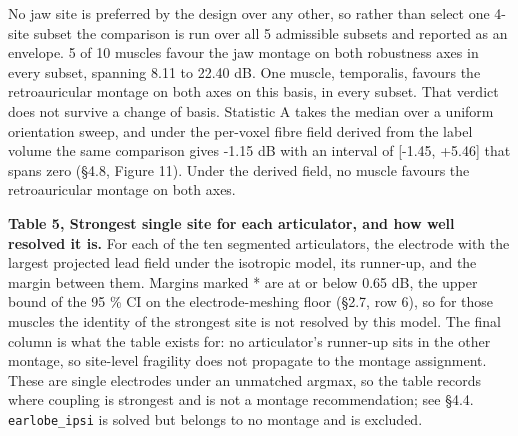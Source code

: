 \documentclass[
  11pt,
  a4paper,
]{article}
\begin{document}
No jaw site is preferred by the design over any other, so rather than select one
4-site subset the comparison is run over all 5 admissible subsets and reported as
an envelope. 5 of 10 muscles favour the jaw montage on both robustness axes in
every subset, spanning 8.11 to 22.40 dB. One muscle, temporalis, favours the
retroauricular montage on both axes on this basis, in every subset. That verdict
does not survive a change of basis. Statistic A takes the median over a uniform
orientation sweep, and under the per-voxel fibre field derived from the label
volume the same comparison gives -1.15 dB with an interval of {[}-1.45, +5.46{]}
that spans zero (§4.8, Figure 11). Under the derived field, no muscle favours the
retroauricular montage on both axes.

\textbf{Table 5, Strongest single site for each articulator, and how well resolved it
is.} For each of the ten segmented articulators, the electrode with the largest
projected lead field under the isotropic model, its runner-up, and the margin
between them. Margins marked * are at or below 0.65 dB, the upper bound of the
95 \% CI on the electrode-meshing floor (§2.7, row 6), so for those muscles the
identity of the strongest site is not resolved by this model. The final column
is what the table exists for: no articulator's runner-up sits in the other
montage, so site-level fragility does not propagate to the montage assignment.
These are single electrodes under an unmatched argmax, so the table records
where coupling is strongest and is not a montage recommendation; see §4.4.
\texttt{earlobe\_ipsi} is solved but belongs to no montage and is excluded.
\end{document}
